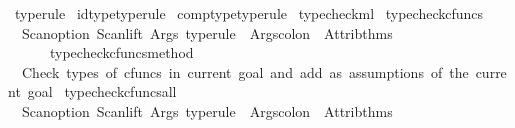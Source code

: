 \begin{isabellebody}
\begin{isamarkuptext}
\end{isamarkuptext}\isamarkuptrue%
\isamarkupfalse%
\ type{\isacharunderscore}{\kern0pt}rule\isanewline
\isanewline
{}\isamarkupfalse%
\ id{\isacharunderscore}{\kern0pt}type{\isacharbrackleft}{\kern0pt}type{\isacharunderscore}{\kern0pt}rule{\isacharbrackright}{\kern0pt}\isanewline
{}\isamarkupfalse%
\ comp{\isacharunderscore}{\kern0pt}type{\isacharbrackleft}{\kern0pt}type{\isacharunderscore}{\kern0pt}rule{\isacharbrackright}{\kern0pt}\isanewline
%
\isadelimML
\isanewline
%
\endisadelimML
%
\isatagML
{}\isamarkupfalse%
\ {\isacartoucheopen}typecheck{\isachardot}{\kern0pt}ml{\isacartoucheclose}%
\endisatagML
{\isafoldML}%
%
\isadelimML
%
\endisadelimML
%
\isadelimdocument
%
\endisadelimdocument
%
\isatagdocument
%
\isamarkuptrue%
%
\endisatagdocument
{\isafolddocument}%
%
\isadelimdocument
%
\endisadelimdocument
%
\isadelimML
%
\endisadelimML
%
\isatagML
{}\isamarkupfalse%
\ typecheck{\isacharunderscore}{\kern0pt}cfuncs\ {\isacharequal}{\kern0pt}\isanewline
\ \ {\isacartoucheopen}Scan{\isachardot}{\kern0pt}option\ {\isacharparenleft}{\kern0pt}{\isacharparenleft}{\kern0pt}Scan{\isachardot}{\kern0pt}lift\ {\isacharparenleft}{\kern0pt}Args{\isachardot}{\kern0pt}{\isachardollar}{\kern0pt}{\isachardollar}{\kern0pt}{\isachardollar}{\kern0pt}\ {\isachardoublequote}{\kern0pt}type{\isacharunderscore}{\kern0pt}rule{\isachardoublequote}{\kern0pt}\ {\isacharminus}{\kern0pt}{\isacharminus}{\kern0pt}\ Args{\isachardot}{\kern0pt}colon{\isacharparenright}{\kern0pt}{\isacharparenright}{\kern0pt}\ {\isacharbar}{\kern0pt}{\isacharminus}{\kern0pt}{\isacharminus}{\kern0pt}\ Attrib{\isachardot}{\kern0pt}thms{\isacharparenright}{\kern0pt}\isanewline
\ \ \ \ \ {\isachargreater}{\kern0pt}{\isachargreater}{\kern0pt}\ typecheck{\isacharunderscore}{\kern0pt}cfuncs{\isacharunderscore}{\kern0pt}method{\isacartoucheclose}\isanewline
\ \ {\isachardoublequoteopen}Check\ types\ of\ cfuncs\ in\ current\ goal\ and\ add\ as\ assumptions\ of\ the\ current\ goal{\isachardoublequoteclose}\isanewline
\isanewline
{}\isamarkupfalse%
\ typecheck{\isacharunderscore}{\kern0pt}cfuncs{\isacharunderscore}{\kern0pt}all\ {\isacharequal}{\kern0pt}\isanewline
\ \ {\isacartoucheopen}Scan{\isachardot}{\kern0pt}option\ {\isacharparenleft}{\kern0pt}{\isacharparenleft}{\kern0pt}Scan{\isachardot}{\kern0pt}lift\ {\isacharparenleft}{\kern0pt}Args{\isachardot}{\kern0pt}{\isachardollar}{\kern0pt}{\isachardollar}{\kern0pt}{\isachardollar}{\kern0pt}\ {\isachardoublequote}{\kern0pt}type{\isacharunderscore}{\kern0pt}rule{\isachardoublequote}{\kern0pt}\ {\isacharminus}{\kern0pt}{\isacharminus}{\kern0pt}\ Args{\isachardot}{\kern0pt}colon{\isacharparenright}{\kern0pt}{\isacharparenright}{\kern0pt}\ {\isacharbar}{\kern0pt}{\isacharminus}{\kern0pt}{\isacharminus}{\kern0pt}\ Attrib{\isachardot}{\kern0pt}thms{\isacharparenright}{\kern0pt}\isanewline

\end{isabellebody}
